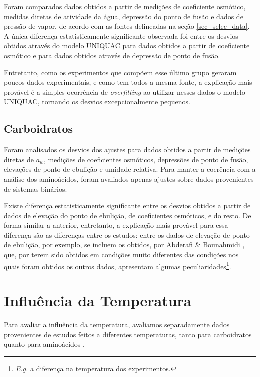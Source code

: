 \documentclass[
	12pt,				%
	openright,
	twoside,
	a4paper,			%
	english,			%
	french,				%
	spanish,			%
	brazil				%
	]{abntex2}
\begin{document}
Foram comparados dados obtidos a partir de medições de coeficiente osmótico,
medidas diretas de atividade da água, depressão do ponto de fusão e dados de
pressão de vapor, de acordo com as fontes delineadas na seção \ref{sec_selec_data}.
A única diferença estatisticamente significante observada foi entre os desvios
obtidos através do modelo UNIQUAC para dados obtidos a partir de coeficiente
osmótico e para dados obtidos através de depressão de ponto de fusão.

Entretanto, como os experimentos que compõem esse último grupo geraram poucos
dados experimentais, e como tem todos a mesma fonte, a explicação mais provável
é a simples ocorrência de \textit{overfitting} ao utilizar nesses dados o modelo
UNIQUAC, tornando os desvios excepcionalmente pequenos.

\subsection{Carboidratos}

Foram analisados os desvios dos ajustes para dados obtidos a partir de medições
diretas de $a_w$, medições de coeficientes osmóticos, depressões de ponto de fusão,
elevações de ponto de ebulição e umidade relativa. Para manter a coerência com a
análise dos aminoácidos, foram avaliados apenas ajustes sobre dados provenientes de
sistemas binários.

Existe diferença estatisticamente significante entre os desvios obtidos a partir
de dados de elevação do ponto de ebulição, de coeficientes osmóticos, e do resto.
De forma similar a anterior, entretanto, a explicação mais provável para essa
diferença são as diferenças entre os estudos: entre os dados de elevação de ponto
de ebulição, por exemplo, se incluem os obtidos, por Abderafi \& Bounahmidi
\cite{abderafi1994}, que, por terem sido obtidos em condições muito diferentes
das condições nos quais foram obtidos os outros dados, apresentam algumas
peculiaridades\footnote{%
	\textit{E.g.} a diferença na temperatura dos experimentos.
}.


\section{Influência da Temperatura}

Para avaliar a influência da temperatura, avaliamos separadamente dados
provenientes de estudos feitos a diferentes temperaturas, tanto para carboidratos
\cite{velezmoro2000} quanto para aminoácidos \cite{romero2006,tsurko2007}.
\end{document}
